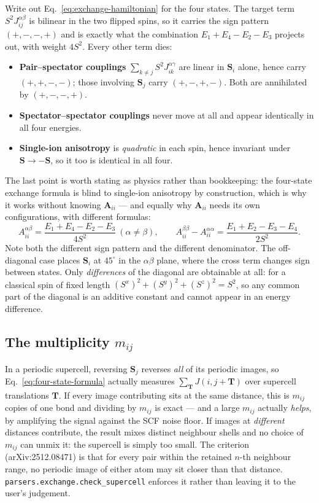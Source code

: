 \documentclass[11pt]{article}
\begin{document}
Write out Eq.~\eqref{eq:exchange-hamiltonian} for the four states. The target
term $S^2J^{\alpha\beta}_{ij}$ is bilinear in the two flipped spins, so it
carries the sign pattern $(+,-,-,+)$ and is exactly what the combination
$E_1+E_4-E_2-E_3$ projects out, with weight $4S^2$. Every other term dies:
\begin{itemize}
  \item \textbf{Pair--spectator couplings} $\sum_{k\neq j}S^2J^{\alpha\gamma}_{ik}$
    are linear in $\mathbf S_i$ alone, hence carry $(+,+,-,-)$; those involving
    $\mathbf S_j$ carry $(+,-,+,-)$. Both are annihilated by $(+,-,-,+)$.
  \item \textbf{Spectator--spectator couplings} never move at all and appear
    identically in all four energies.
  \item \textbf{Single-ion anisotropy} is \emph{quadratic} in each spin, hence
    invariant under $\mathbf S\to-\mathbf S$, so it too is identical in all four.
\end{itemize}
The last point is worth stating as physics rather than bookkeeping: the four-state
exchange formula is blind to single-ion anisotropy by construction, which is why
it works without knowing $\mathbf A_{ii}$ --- and equally why $\mathbf A_{ii}$
needs its own configurations, with different formulas:
\begin{equation}
  A_{ii}^{\alpha\beta}=\frac{E_1+E_4-E_2-E_3}{4S^2}\ (\alpha\neq\beta),
  \qquad
  A_{ii}^{\beta\beta}-A_{ii}^{\alpha\alpha}=\frac{E_1+E_2-E_3-E_4}{2S^2}.
  \label{eq:sia}
\end{equation}
Note both the different sign pattern and the different denominator. The
off-diagonal case places $\mathbf S_i$ at $45^\circ$ in the $\alpha\beta$ plane,
where the cross term changes sign between states. Only \emph{differences} of the
diagonal are obtainable at all: for a classical spin of fixed length
$(S^x)^2+(S^y)^2+(S^z)^2=S^2$, so any common part of the diagonal is an additive
constant and cannot appear in an energy difference.

\subsection{The multiplicity $m_{ij}$}

In a periodic supercell, reversing $\mathbf S_j$ reverses \emph{all} of its
periodic images, so Eq.~\eqref{eq:four-state-formula} actually measures
$\sum_{\mathbf T}J(i,j+\mathbf T)$ over supercell translations $\mathbf T$. If
every image contributing sits at the same distance, this is $m_{ij}$ copies of
one bond and dividing by $m_{ij}$ is exact --- and a large $m_{ij}$ actually
\emph{helps}, by amplifying the signal against the SCF noise floor. If images at
\emph{different} distances contribute, the result mixes distinct neighbour
shells and no choice of $m_{ij}$ can unmix it: the supercell is simply too
small. The criterion (arXiv:2512.08471) is that for every pair within the
retained $n$-th neighbour range, no periodic image of either atom may sit closer
than that distance. \texttt{parsers.exchange.check\_supercell} enforces it
rather than leaving it to the user's judgement.
\end{document}
